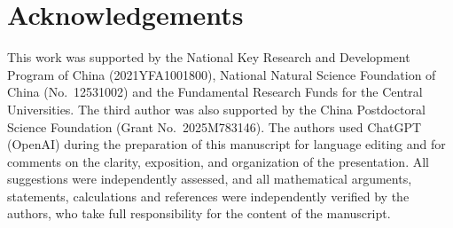 \documentclass[11pt,reqno]{amsart}
\theoremstyle{definition}
\theoremstyle{remark}
\numberwithin{equation}{section}
\begin{document}
\section*{Acknowledgements}
This work was supported by the National Key Research and Development Program of China (2021YFA1001800), National Natural Science Foundation of China (No.~12531002) and the Fundamental Research Funds for the Central Universities.  The third author was also supported by the China Postdoctoral Science Foundation (Grant No.~2025M783146). The authors used ChatGPT (OpenAI) during the preparation of this 
manuscript for language editing and for comments on the clarity,
exposition, and organization of the presentation. All suggestions were
independently assessed, and all mathematical arguments, statements,
calculations and references were independently verified by the authors,
who take full responsibility for the content of the manuscript.
\end{document}
